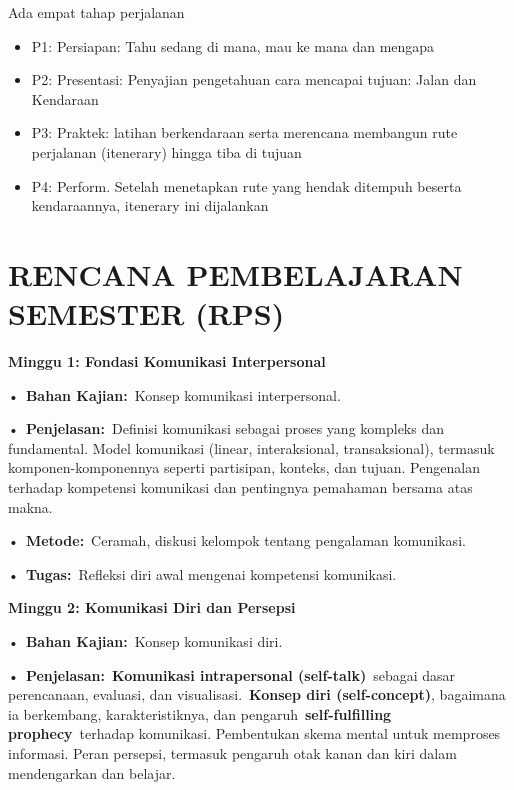\documentclass[
  letterpaper,
  DIV=11,
  numbers=noendperiod]{scrreprt}
\begin{document}

Ada empat tahap perjalanan

\begin{itemize}
\item
  P1: Persiapan: Tahu sedang di mana, mau ke mana dan mengapa
\item
  P2: Presentasi: Penyajian pengetahuan cara mencapai tujuan: Jalan dan
  Kendaraan
\item
  P3: Praktek: latihan berkendaraan serta merencana membangun rute
  perjalanan (itenerary) hingga tiba di tujuan
\item
  P4: Perform. Setelah menetapkan rute yang hendak ditempuh beserta
  kendaraannya, itenerary ini dijalankan
\end{itemize}


\chapter*{RENCANA PEMBELAJARAN SEMESTER
(RPS)}\label{rencana-pembelajaran-semester-rps}


\textbf{Minggu 1: Fondasi Komunikasi Interpersonal}

•~\textbf{Bahan Kajian:}~Konsep komunikasi interpersonal.

•~\textbf{Penjelasan:}~Definisi komunikasi sebagai proses yang kompleks
dan fundamental. Model komunikasi (linear, interaksional,
transaksional), termasuk komponen-komponennya seperti partisipan,
konteks, dan tujuan. Pengenalan terhadap kompetensi komunikasi dan
pentingnya pemahaman bersama atas makna.

•~\textbf{Metode:}~Ceramah, diskusi kelompok tentang pengalaman
komunikasi.

•~\textbf{Tugas:}~Refleksi diri awal mengenai kompetensi komunikasi.

\textbf{Minggu 2: Komunikasi Diri dan Persepsi}

•~\textbf{Bahan Kajian:}~Konsep komunikasi diri.

•~\textbf{Penjelasan:}~\textbf{Komunikasi intrapersonal
(self-talk)}~sebagai dasar perencanaan, evaluasi, dan
visualisasi.~\textbf{Konsep diri (self-concept)}, bagaimana ia
berkembang, karakteristiknya, dan pengaruh~\textbf{self-fulfilling
prophecy}~terhadap komunikasi. Pembentukan skema mental untuk memproses
informasi. Peran persepsi, termasuk pengaruh otak kanan dan kiri dalam
mendengarkan dan belajar.
\end{document}
